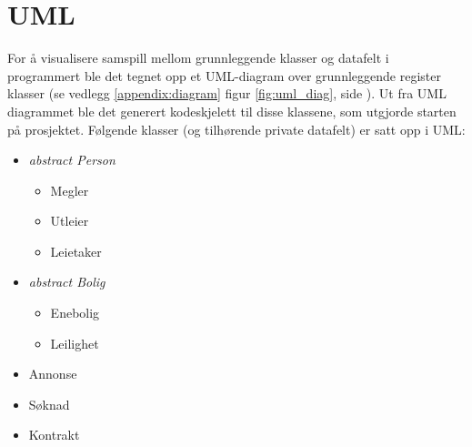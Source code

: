 \section{UML}
For å visualisere samspill mellom grunnleggende klasser og datafelt i programmert ble det tegnet opp et UML-diagram over grunnleggende register klasser (se vedlegg \ref{appendix:diagram} figur \ref{fig:uml_diag}, side \pageref{appendix:diagram}). Ut fra UML diagrammet ble det generert kodeskjelett til disse klassene, som utgjorde starten på prosjektet. Følgende klasser (og tilhørende private datafelt) er satt opp i UML:
\begin{itemize}[noitemsep,nolistsep]
	\item \textit{abstract Person}
		\begin{itemize}
			\item Megler
			\item Utleier
			\item Leietaker
		\end{itemize}
	\item \textit{abstract Bolig}
		\begin{itemize}
			\item Enebolig
			\item Leilighet
		\end{itemize}
	\item Annonse
	\item Søknad
	\item Kontrakt
\end{itemize}


